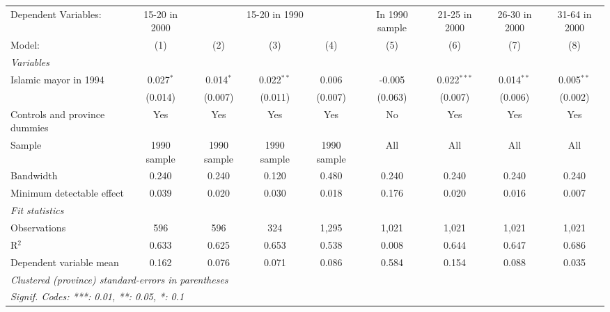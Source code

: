 
\begingroup
\centering
\begin{adjustbox}{max width=\textwidth}
   \begin{tabular}{lcccccccc}
      \tabularnewline \midrule \midrule
      Dependent Variables: & 15-20 in 2000 & \multicolumn{3}{c}{15-20 in 1990} & In 1990 sample & 21-25 in 2000 & 26-30 in 2000 & 31-64 in 2000\\
      Model:                        & (1)         & (2)         & (3)          & (4)         & (5)     & (6)           & (7)          & (8)\\  
      \midrule
      \emph{Variables}\\
      Islamic mayor in 1994         & 0.027$^{*}$ & 0.014$^{*}$ & 0.022$^{**}$ & 0.006       & -0.005  & 0.022$^{***}$ & 0.014$^{**}$ & 0.005$^{**}$\\   
                                    & (0.014)     & (0.007)     & (0.011)      & (0.007)     & (0.063) & (0.007)       & (0.006)      & (0.002)\\   
      Controls and province dummies & Yes         & Yes         & Yes          & Yes         & No      & Yes           & Yes          & Yes\\  
      Sample                        & 1990 sample & 1990 sample & 1990 sample  & 1990 sample & All     & All           & All          & All\\  
      Bandwidth                     & 0.240       & 0.240       & 0.120        & 0.480       & 0.240   & 0.240         & 0.240        & 0.240\\  
      Minimum detectable effect     & 0.039       & 0.020       & 0.030        & 0.018       & 0.176   & 0.020         & 0.016        & 0.007\\  
      \midrule
      \emph{Fit statistics}\\
      Observations                  & 596         & 596         & 324          & 1,295       & 1,021   & 1,021         & 1,021        & 1,021\\  
      R$^2$                         & 0.633       & 0.625       & 0.653        & 0.538       & 0.008   & 0.644         & 0.647        & 0.686\\  
      Dependent variable mean       & 0.162       & 0.076       & 0.071        & 0.086       & 0.584   & 0.154         & 0.088        & 0.035\\  
      \midrule \midrule
      \multicolumn{9}{l}{\emph{Clustered (province) standard-errors in parentheses}}\\
      \multicolumn{9}{l}{\emph{Signif. Codes: ***: 0.01, **: 0.05, *: 0.1}}\\
   \end{tabular}
\end{adjustbox}
\par\endgroup


